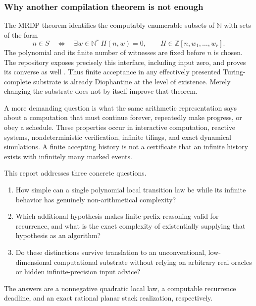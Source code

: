 \documentclass[11pt,letterpaper]{article}
\theoremstyle{definition}
\theoremstyle{remark}
\newcommand{\N}{\mathbb N}
\newcommand{\Z}{\mathbb Z}
\newcommand{\1}{\mathbf 1}
\begin{document}
\subsubsection{Why another compilation theorem is not enough}
The MRDP theorem identifies the computably enumerable subsets of $\N$ with
sets of the form
\begin{equation}\label{lbh:ql:eq:mrdp}
 n\in S\quad\Longleftrightarrow\quad
 \exists w\in\N^r\;H(n,w)=0,
 \qquad H\in\Z[n,w_1,\ldots,w_r].
\end{equation}
The polynomial and its finite number of witnesses are fixed before $n$ is
chosen. The repository exposes precisely this interface, including input zero,
and proves its converse as well \cite{ql-repo-mrdp}. Thus finite acceptance in any
effectively presented Turing-complete substrate is already Diophantine at the
level of existence. Merely changing the substrate does not by itself improve
that theorem.

A more demanding question is what the same arithmetic representation says
about a computation that must continue forever, repeatedly make progress,
or obey a schedule. These properties occur in interactive computation,
reactive systems, nondeterministic verification, infinite tilings, and exact
dynamical simulations. A finite accepting history is not a certificate that
an infinite history exists with infinitely many marked events.

This report addresses three concrete questions.
\begin{enumerate}[label=\textbf{Q\arabic*.},leftmargin=3em]
\item How simple can a single polynomial local transition law be while its
infinite behavior has genuinely non-arithmetical complexity?
\item Which additional hypothesis makes finite-prefix reasoning valid for
recurrence, and what is the exact complexity of existentially supplying that
hypothesis as an algorithm?
\item Do these distinctions survive translation to an unconventional,
low-dimensional computational substrate without relying on arbitrary real
oracles or hidden infinite-precision input advice?
\end{enumerate}
The answers are a nonnegative quadratic local law, a computable recurrence
deadline, and an exact rational planar stack realization, respectively.
\end{document}
